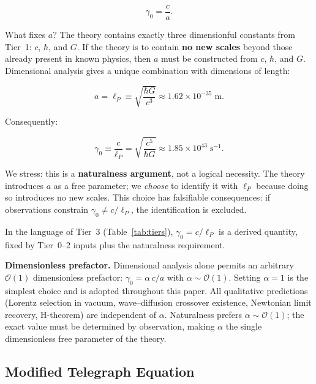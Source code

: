 \documentclass[aps,prd,twocolumn,showpacs,superscriptaddress,preprintnumbers]{revtex4-2}
\begin{document}
\begin{equation}
\gamma_0 = \frac{c}{a}.
\label{eq:gamma0_form}
\end{equation}

What fixes $a$?
The theory contains exactly three dimensionful constants from Tier~1: $c$, $\hbar$, and $G$.
If the theory is to contain \textbf{no new scales} beyond those already present in known physics, then $a$ must be constructed from $c$, $\hbar$, and $G$.
Dimensional analysis gives a unique combination with dimensions of length:

\begin{equation}
a = \ell_P \equiv \sqrt{\frac{\hbar G}{c^3}} \approx 1.62 \times 10^{-35}\;\text{m}.
\label{eq:lp_def}
\end{equation}

Consequently:

\begin{equation}
\boxed{\gamma_0 \equiv \frac{c}{\ell_P} = \sqrt{\frac{c^5}{\hbar G}} \approx 1.85 \times 10^{43}\;\text{s}^{-1}}.
\label{eq:gamma0}
\end{equation}

We stress: this is a \textbf{naturalness argument}, not a logical necessity.
The theory introduces $a$ as a free parameter; we \emph{choose} to identify it with $\ell_P$ because doing so introduces no new scales.
This choice has falsifiable consequences: if observations constrain $\gamma_0 \neq c/\ell_P$, the identification is excluded.

In the language of Tier~3 (Table~\ref{tab:tiers}), $\gamma_0=c/\ell_P$ is a derived quantity, fixed by Tier~0--2 inputs plus the naturalness requirement.

\textbf{Dimensionless prefactor.}
Dimensional analysis alone permits an arbitrary $\mathcal{O}(1)$ dimensionless prefactor: $\gamma_0 = \alpha\,c/a$ with $\alpha\sim\mathcal{O}(1)$.
Setting $\alpha=1$ is the simplest choice and is adopted throughout this paper.
All qualitative predictions (Lorentz selection in vacuum, wave--diffusion crossover existence, Newtonian limit recovery, H-theorem) are independent of $\alpha$.
Naturalness prefers $\alpha\sim\mathcal{O}(1)$; the exact value must be determined by observation, making $\alpha$ the single dimensionless free parameter of the theory.

\subsection{Modified Telegraph Equation}
\end{document}
